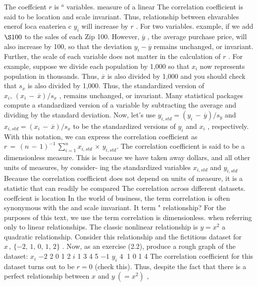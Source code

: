 \documentclass[11pt]{article}
\begin{document}
The coeffcient \(r\) is \({}^{a}\) variables.
 measure of a linear The correlation coefficient is said to be location and scale invariant. Thus,
 relationship between ehvarables enerof loca  eaateriea c \(y_{i}\) will increase by \(r\) . For
 two variables. example, if we add \(\S1 0 0\) to the sales of each \(\mathrm{Z i p}\)
100. However, \(\overline{{y}}\) , the average purchase price, will also increase by 100, so that
 the deviation \(y_{i}-\overline{{y}}\) remains unchanged, or invariant. Further, the scale of each
 variable does not matter in the calculation of \(r\) . For example, suppose we divide
each population by 1,000 so that \(x_{i}\) now represents population in thousands.
Thus, \(\overline{{x}}\) is also divided by 1,000 and you should check that \(s_{x}\) is also divided by
1,000. Thus, the standardized version of \(x_{i} , \, ( x_{i} \,-\, \overline{{x}} ) / s_{x}\) , remains unchanged, or
 invariant. Many statistical packages compute a standardized version of a variable
by subtracting the average and dividing by the standard deviation. Now, let's use
\(y_{i , s t d}=( y_{i} \,-\, \overline{{y}} ) / s_{y}\) and \(x_{i , s t d}=( x_{i} \,-\, \overline{{x}} ) / s_{x}\) to be the standardized versions of \(y_{i}\)
and \(x_{i}\) , respectively. With this notation, we can express the correlation coefficient
as \(r \,=\, ( n \,-\, 1 )^{-1} \, \sum_{i=1}^{n} x_{i , s t d} \, \times\, y_{i , s t d} .\)
The correlation coefficient is said to be a dimensionless measure. This is
because we have taken away dollars, and all other units of measures, by consider-
 ing the standardized variables \(x_{i , s t d}\) and \(y_{i , s t d}\) Because the correlation coefficient
does not depend on units of measure, it is a statistic that can readily be compared
 The correlation across different datasets.
coeffcient is location In the world of business, the term correlation is often synonymous with the
and scale imvariant. It  term " relationship? For the purposes of this text, we use the term correlation
is dimensionless.
when referring only to linear relationships. The classic nonlinear relationship
is \(y=x^{2}\) a quadratic relationship. Consider this relationship and the fictitious
 dataset for \(x \, , \, \{-2 , \, 1 , \, 0 , \, 1 , \, 2 \}\) . Now, as an exercise (2.2), produce a rough graph
of the dataset:
\(x_{i}\) \(- 2\) 2 0 1 2
\(i\) 1 3 4 5
\(- 1\)
\(y_{i}\) \(4 ~\) 1 0 1 4
The correlation coefficient for this dataset turns out to be \(r=0\) (check this).
Thus, despite the fact that there is a perfect relationship between \(x\) and \(y ~ (=x^{2} )\) ,
\end{document}
